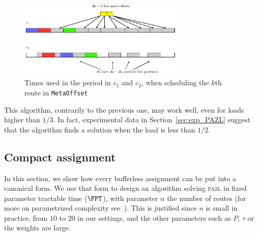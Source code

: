 \documentclass[a4paper,10pt]{article}
\newcommand\metaoffset{\texttt{MetaOffset}\xspace}
\newcommand\pazl{\textsc{pazl}\xspace}
\begin{document}
     \begin{figure}
      \begin{center}
      \includegraphics[width=0.7\textwidth]{ex3nt.pdf}
      \end{center}
      \caption{Times used in the period in $c_1$ and $c_2$, when scheduling the $k$th route in \metaoffset}
      \label{fig:metaoffset}
      \end{figure}


% 
% 
% 
	
This algorithm, contrarily to the previous one, may work well, even for loads higher than $1/3$.
In fact, experimental data in Section~\ref{sec:exp_PAZL} suggest that the algorithm finds a solution when the load is less than $1/2$.


\subsection{Compact assignment}

In this section, we show how every bufferless assignment can be put into a canonical form.
We use that form to design an algorithm solving \pazl in fixed parameter tractable time ($\FPT$), with parameter $n$ the number of routes (for more on parametrized complexity see~\cite{downey2012parameterized}). This is justified since $n$ is small in practice, from $10$ to $20$ in our settings, and the other parameters such as $P$, $\tau$ or the weights are large.
\end{document}
